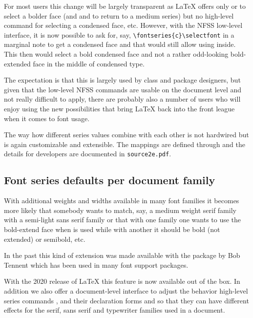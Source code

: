 \documentclass{ltnews}
\begin{document}
For most users this change will be largely transparent as \LaTeX{}
offers only  or  to select a bolder face (and
 and  to return to a medium series) but no
high-level command for selecting a condensed face, etc. However, with
the NFSS low-level interface, it is now possible to ask for, say,
\verb=\fontseries{c}\selectfont= in a marginal note to get a condensed
face and that would still allow  using  inside. This then would
select a bold condensed face and not a rather odd-looking
bold-extended face in the middle of condensed type.

The expectation is that this is largely used by class and package
designers, but given that the low-level NFSS commands are usable on
the document level and not really difficult to apply, there are
probably also a number of users who will enjoy using the new
possibilities that bring \LaTeX{} back into the front league when it
comes to font usage.

The way how different series values combine with each other is not
hardwired but is again customizable and extensible. The mappings are
defined through  and the details for
developers are documented in \texttt{source2e.pdf}.



\subsection{Font series defaults per document family}

With additional weights and widths available in many font families it
becomes more likely that somebody wants to match, say, a medium weight
serif family with a semi-light sans serif family or that with one
family one wants to use the bold-extend face when  is used
while with another it should be bold (not extended) or semibold, etc.

In the past this kind of extension was made available with the
 package by Bob Tennent which has been used in many font
support packages.

With the 2020 release of \LaTeX{} this feature is now available out
of the box.  In addition we also offer a document-level interface to adjust the
behavior high-level series commands ,  and their
declaration forms  and  so that they can
have different effects for the serif, sans serif and typewriter
families used in a document.
\end{document}
